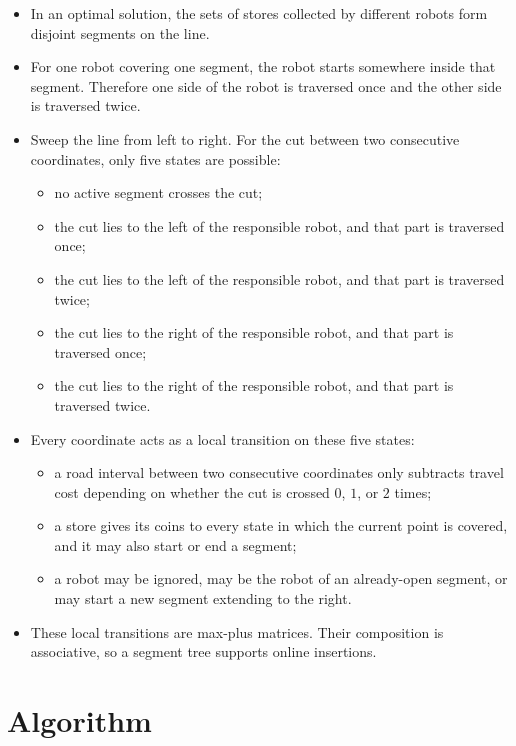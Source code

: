 \documentclass[11pt]{article}
\begin{document}
\begin{itemize}[leftmargin=*]
    \item In an optimal solution, the sets of stores collected by different robots form disjoint segments on the line.
    \item For one robot covering one segment, the robot starts somewhere inside that segment. Therefore one side of the robot is traversed once and the other side is traversed twice.
    \item Sweep the line from left to right. For the cut between two consecutive coordinates, only five states are possible:
    \begin{itemize}[leftmargin=*]
        \item no active segment crosses the cut;
        \item the cut lies to the left of the responsible robot, and that part is traversed once;
        \item the cut lies to the left of the responsible robot, and that part is traversed twice;
        \item the cut lies to the right of the responsible robot, and that part is traversed once;
        \item the cut lies to the right of the responsible robot, and that part is traversed twice.
    \end{itemize}
    \item Every coordinate acts as a local transition on these five states:
    \begin{itemize}[leftmargin=*]
        \item a road interval between two consecutive coordinates only subtracts travel cost depending on whether the cut is crossed $0$, $1$, or $2$ times;
        \item a store gives its coins to every state in which the current point is covered, and it may also start or end a segment;
        \item a robot may be ignored, may be the robot of an already-open segment, or may start a new segment extending to the right.
    \end{itemize}
    \item These local transitions are max-plus matrices. Their composition is associative, so a segment tree supports online insertions.
\end{itemize}

\section*{Algorithm}
\end{document}
